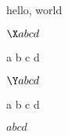 \documentclass{amsart}
\begin{document}
hello, world

$\X a b c d$

\X a b c d

$\Y a b c d$

\Y a b c d

$\!a b\! c d$
\end{document}
